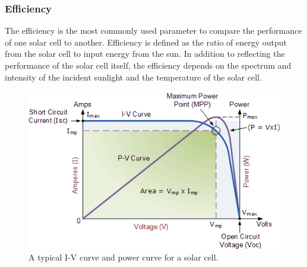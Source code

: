 \documentclass[%
 aip,
 amsmath,amssymb,
 reprint, floatfix%
]{revtex4-2}
\begin{document}
    \subsubsection{Efficiency}
        The efficiency is the most commonly used parameter to compare the performance of one solar cell to another. Efficiency is defined as the ratio of energy output from the solar cell to input energy from the sun. In addition to reflecting the performance of the solar cell itself, the efficiency depends on the spectrum and intensity of the incident sunlight and the temperature of the solar cell.
        \begin{figure}
            \centering
            \includegraphics[scale = 0.5]{Figures/alt120.png}
            \caption{A typical I-V curve and power curve for a solar cell.}
            \label{fig:typicaliv}
        \end{figure}
    
\end{document}

